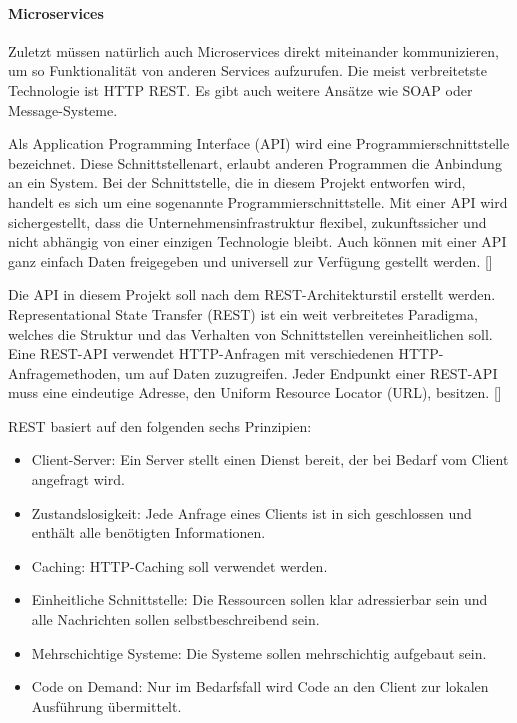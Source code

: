 \paragraph{Microservices}

Zuletzt müssen natürlich auch Microservices direkt miteinander kommunizieren, um so Funktionalität von anderen Services aufzurufen. Die meist verbreitetste Technologie ist HTTP REST. Es gibt auch weitere Ansätze wie SOAP oder Message-Systeme.

Als Application Programming Interface (API) wird eine Programmierschnittstelle bezeichnet. Diese Schnittstellenart, erlaubt anderen Programmen die Anbindung an ein System. Bei der Schnittstelle, die in diesem Projekt entworfen wird, handelt es sich um eine sogenannte Programmierschnittstelle. Mit einer API wird sichergestellt, dass die Unternehmensinfrastruktur flexibel, zukunftssicher und nicht abhängig von einer einzigen Technologie bleibt. Auch können mit einer API ganz einfach Daten freigegeben und universell zur Verfügung gestellt werden. [\cite[S. 95ff]{koflerDigitale2018}]

Die API in diesem Projekt soll nach dem REST-Architekturstil erstellt werden. Representational State Transfer (REST) ist ein weit verbreitetes Paradigma, welches die Struktur und das Verhalten von Schnittstellen vereinheitlichen soll. Eine REST-API verwendet HTTP-Anfragen mit verschiedenen HTTP-Anfragemethoden, um auf Daten zuzugreifen. Jeder Endpunkt einer REST-API muss eine eindeutige Adresse, den Uniform Resource Locator (URL), besitzen. [\cite[S. 76ff]{fieldingArchitectural2000}]

REST basiert auf den folgenden sechs Prinzipien:
\begin{itemize}
\item Client-Server: Ein Server stellt einen Dienst bereit, der bei Bedarf vom Client angefragt wird.
\item Zustandslosigkeit: Jede Anfrage eines Clients ist in sich geschlossen und enthält alle benötigten Informationen.
\item Caching: HTTP-Caching soll verwendet werden.
\item Einheitliche Schnittstelle: Die Ressourcen sollen klar adressierbar sein und alle Nachrichten sollen selbstbeschreibend sein.
\item Mehrschichtige Systeme: Die Systeme sollen mehrschichtig aufgebaut sein.
\item Code on Demand: Nur im Bedarfsfall wird Code an den Client zur lokalen Ausführung übermittelt.
\end{itemize}


